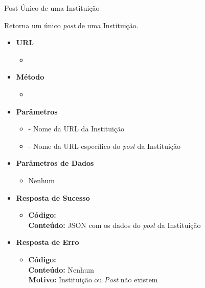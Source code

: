 
\begin{caixa}{Post Único de uma Instituição}{}

Retorna um único \emph{post} de uma Instituição.

\begin{itemize}
\item \textbf{URL}
	\begin{itemize}
		\item {}
	\end{itemize}

\item \textbf{Método}
	\begin{itemize}
		\item {}
	\end{itemize}

\item \textbf{Parâmetros}
	\begin{itemize}
		\item {} - Nome da URL da Instituição
        \item {} - Nome da URL específico do \emph{post} da Instituição
	\end{itemize}

\item \textbf{Parâmetros de Dados}
	\begin{itemize}
		\item Nenhum
	\end{itemize}

\item \textbf{Resposta de Sucesso}
	\begin{itemize}
		\item \textbf{Código:}  \\ \textbf{Conteúdo:} JSON com os dados do \emph{post} da Instituição
	\end{itemize}

\item \textbf{Resposta de Erro}
	\begin{itemize}
		\item \textbf{Código:}  \\ \textbf{Conteúdo:} Nenhum \\ \textbf{Motivo:} Instituição ou \emph{Post} não existem
	\end{itemize}

\end{itemize}
\end{caixa}


